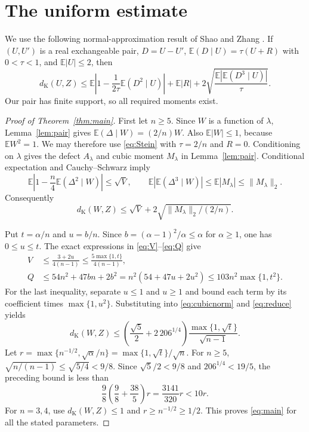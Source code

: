 \documentclass[11pt]{article}
\newcommand{\E}{\mathbb E}
\newcommand{\dK}{d_{\mathrm K}}
\begin{document}
\section{The uniform estimate}

We use the following normal-approximation result of Shao and Zhang
\cite[Corollary~2.2 of version~2]{SZ}. If $(U,U')$ is a real exchangeable
pair, $D=U-U'$, $\E(D\mid U)=\tau(U+R)$ with $0<\tau<1$, and
$\E|U|\le2$, then
\begin{equation}\label{eq:Stein}
 \dK(U,Z)\le
 \E\left|1-\frac1{2\tau}\E(D^2\mid U)\right|+\E|R|
       +2\sqrt{\frac{\E|\E(D^3\mid U)|}{\tau}}.
\end{equation}
Our pair has finite support, so all required moments exist.

\begin{proof}[Proof of Theorem~\ref{thm:main}]
First let $n\ge5$. Since $W$ is a function of $\lambda$,
Lemma~\ref{lem:pair} gives $\E(\Delta\mid W)=(2/n)W$.
Also $\E|W|\le1$, because $\E W^2=1$.
We may therefore use \eqref{eq:Stein} with $\tau=2/n$ and $R=0$.
Conditioning on $\lambda$ gives the defect $A_\lambda$ and cubic moment
$M_\lambda$ in Lemma~\ref{lem:pair}. Conditional expectation and
Cauchy--Schwarz imply
\[
 \E\left|1-\frac n4\E(\Delta^2\mid W)\right|\le\sqrt V,
 \qquad \E|\E(\Delta^3\mid W)|\le\E|M_\lambda|\le\|M_\lambda\|_2.
\]
Consequently
\begin{equation}\label{eq:reduce}
 \dK(W,Z)\le\sqrt V+2\sqrt{\|M_\lambda\|_2/(2/n)}.
\end{equation}

Put $t=\alpha/n$ and $u=b/n$. Since
$b=(\alpha-1)^2/\alpha\le\alpha$ for $\alpha\ge1$, one has $0\le u\le t$.
The exact expressions in \eqref{eq:V}--\eqref{eq:Q} give
\begin{align*}
 V&\le\frac{3+2u}{4(n-1)}\le\frac{5\max\{1,t\}}{4(n-1)},\\
 Q&\le54n^2+47bn+2b^2
    =n^2(54+47u+2u^2)\le103n^2\max\{1,t^2\}.
\end{align*}
For the last inequality, separate $u\le1$ and $u\ge1$ and bound each term
by its coefficient times $\max\{1,u^2\}$.
Substituting into \eqref{eq:cubicnorm} and \eqref{eq:reduce} yields
\[
 \dK(W,Z)\le\left(\frac{\sqrt5}{2}+2\,206^{1/4}\right)
                   \frac{\max\{1,\sqrt t\}}{\sqrt{n-1}}.
\]
Let $r=\max\{n^{-1/2},\sqrt\alpha/n\}=\max\{1,\sqrt t\}/\sqrt n$.
For $n\ge5$, $\sqrt{n/(n-1)}\le\sqrt{5/4}<9/8$.
Since $\sqrt5/2<9/8$ and $206^{1/4}<19/5$, the preceding bound is less than
\[
 \frac98\left(\frac98+\frac{38}5\right)r
       =\frac{3141}{320}r<10r.
\]
For $n=3,4$, use $\dK(W,Z)\le1$ and $r\ge n^{-1/2}\ge1/2$.
This proves \eqref{eq:main} for all the stated parameters.
\end{proof}
\end{document}
